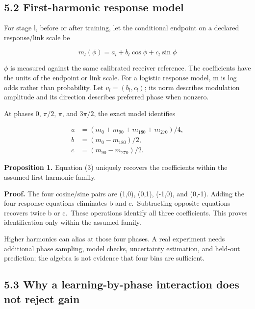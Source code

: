 \documentclass[
  american,
  11pt,
  letterpaper,
]{article}
\begin{document}
\subsection{5.2 First-harmonic response model}\label{first-harmonic-response-model}

For stage l, before or after training, let the conditional endpoint on a declared response/link scale be

\begin{equation}
m_l(\phi)=a_l+b_l\cos\phi+c_l\sin\phi\tag{2}
\end{equation}

\(\phi\) is measured against the same calibrated receiver reference. The coefficients have the units of the endpoint or link scale. For a logistic response model, m is log odds rather than probability. Let \(v_l=(b_l,c_l)\); its norm describes modulation amplitude and its direction describes preferred phase when nonzero.

At phases 0, \(\pi/2\), \(\pi\), and \(3\pi/2\), the exact model identifies

\begin{equation}
\begin{aligned}a&=(m_0+m_{90}+m_{180}+m_{270})/4,\\ b&=(m_0-m_{180})/2,\\ c&=(m_{90}-m_{270})/2.\end{aligned}\tag{3}
\end{equation}

\textbf{Proposition 1.} Equation (3) uniquely recovers the coefficients within the assumed first-harmonic family.

\textbf{Proof.} The four cosine/sine pairs are (1,0), (0,1), (-1,0), and (0,-1). Adding the four response equations eliminates b and c.~Subtracting opposite equations recovers twice b or c.~These operations identify all three coefficients. This proves identification only within the assumed family.

Higher harmonics can alias at those four phases. A real experiment needs additional phase sampling, model checks, uncertainty estimation, and held-out prediction; the algebra is not evidence that four bins are sufficient.

\subsection{5.3 Why a learning-by-phase interaction does not reject gain}\label{why-a-learning-by-phase-interaction-does-not-reject-gain}
\end{document}
